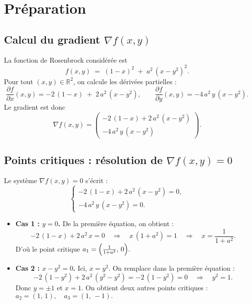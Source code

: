 \documentclass[10pt]{article}
\begin{document}
\section{Préparation}

\subsection{Calcul du gradient \(\nabla f(x,y)\)}

La fonction de Rosenbrock considérée est
\[
    f(x,y) \;=\; (1 - x)^2 \;+\; a^2\,(x - y^2)^2.
\]
Pour tout \((x,y)\in\mathbb{R}^2\), on calcule les dérivées partielles :
\[
\frac{\partial f}{\partial x}(x,y) 
= -2\,(1 - x) \;+\; 2\,a^2\,(x - y^2),
\qquad
\frac{\partial f}{\partial y}(x,y) 
= -4\,a^2\,y\,(x - y^2).
\]
Le gradient est donc
\[
    \nabla f(x,y) 
    = 
    \begin{pmatrix}
    -2\,(1 - x) + 2\,a^2\,(x - y^2) \\[6pt]
    -4\,a^2\,y\,(x - y^2)
    \end{pmatrix}.
\]

\subsection{Points critiques : résolution de \(\nabla f(x,y) = 0\)}

Le système \(\nabla f(x,y) = 0\) s’écrit :
\[
    \begin{cases}
      -2\,(1 - x) + 2\,a^2\,(x - y^2) = 0,\\[4pt]
      -4\,a^2\,y\,(x - y^2) = 0.
    \end{cases}
\]
\begin{itemize}
\item \textbf{Cas 1 : \(y = 0\).}  
  De la première équation, on obtient :
  \[
    -2\,(1 - x) + 2\,a^2\,x = 0 
    \quad\Longrightarrow\quad
    x\,(1 + a^2) = 1
    \quad\Longrightarrow\quad
    x = \frac{1}{1 + a^2}.
  \]
  D’où le point critique
  \(\displaystyle
    a_1 = \Bigl(\tfrac{1}{1 + a^2},\,0\Bigr).
  \)

\item \textbf{Cas 2 : \(x - y^2 = 0\).}  
  Ici, \(x = y^2\). On remplace dans la première équation :
  \[
    -2\,(1 - y^2) + 2\,a^2\,(y^2 - y^2) 
    = -2\,(1 - y^2) = 0
    \quad\Longrightarrow\quad
    y^2 = 1.
  \]
  Donc \(y = \pm 1\) et \(x = 1\). On obtient deux autres points critiques :
  \(\displaystyle
    a_2 = (1,\,1), 
    \quad
    a_3 = (1,\,-1).
  \)
\end{itemize}
\end{document}
